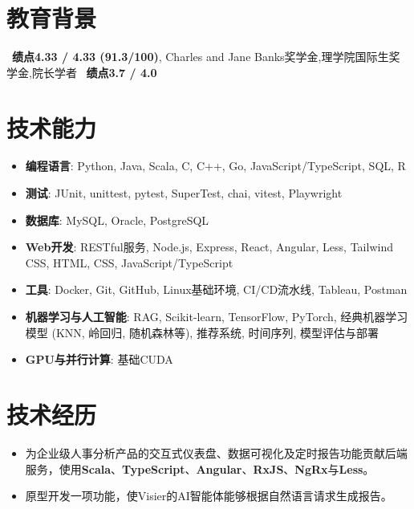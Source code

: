 \documentclass{resume}
\begin{document}




\section{教育背景}
\ \textbf{绩点4.33 / 4.33 (91.3/100)}, Charles and Jane Banks奖学金,理学院国际生奖学金,院长学者
\ \textbf{绩点3.7 / 4.0}

\section{技术能力}
\begin{itemize}[parsep=0.2ex]
  \item \textbf{编程语言}: Python, Java, Scala, C, C++, Go, JavaScript/TypeScript, SQL, R
  \item \textbf{测试}: JUnit, unittest, pytest, SuperTest, chai, vitest, Playwright
  \item \textbf{数据库}: MySQL, Oracle, PostgreSQL
  \item \textbf{Web开发}: RESTful服务, Node.js, Express, React, Angular, Less, Tailwind CSS, HTML, CSS, JavaScript/TypeScript
  \item \textbf{工具}: Docker, Git, GitHub, Linux基础环境, CI/CD流水线, Tableau, Postman
  \item \textbf{机器学习与人工智能}: RAG, Scikit-learn, TensorFlow, PyTorch, 经典机器学习模型 (KNN, 岭回归, 随机森林等), 推荐系统, 时间序列, 模型评估与部署
  \item \textbf{GPU与并行计算}: 基础CUDA
\end{itemize}

\section{技术经历}
\begin{itemize}
  \item 为企业级人事分析产品的交互式仪表盘、数据可视化及定时报告功能贡献后端服务，使用\textbf{Scala}、\textbf{TypeScript}、\textbf{Angular}、\textbf{RxJS}、\textbf{NgRx}与\textbf{Less}。
  \item 原型开发一项功能，使Visier的AI智能体能够根据自然语言请求生成报告。
\end{itemize}
\end{document}
